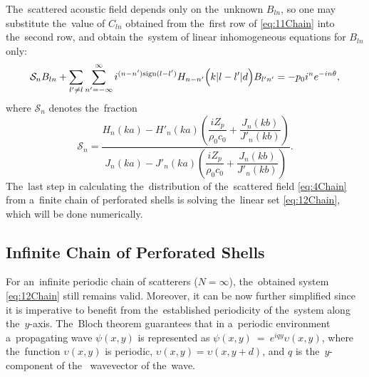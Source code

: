 The~scattered acoustic field depends only on the~unknown $B_{ln}$, so one may substitute the~value of $C_{ln}$ obtained from the~first row of \cref{eq:11Chain} into the~second row, and obtain the~system of linear inhomogeneous equations for $B_{ln}$ only:
\begin{equation}
\label{eq:12Chain}
\mathcal{S}_n B_{ln} + \sum\limits_{l' \neq l} \sum\limits_{n'=-\infty}^{\infty} i^{(n-n')\text{sign}(l-l')} H_{n-n'}\Big(k|l-l'|d\Big) B_{l'n'} = -p_0 i^n e^{-i n\theta},
\end{equation}
where $\mathcal{S}_n$ denotes the~fraction
\begin{equation}
\label{eq:13Chain}
\mathcal{S}_n = \dfrac{H_n\left(k a\right)-H'_n\left(k a\right)\left(\dfrac{i Z_p}{\rho_0 c_0}+\dfrac{J_{n}\left(k b\right)}{J'_{n}\left(k b\right)}\right)}{J_n\left(k a\right)-J'_n\left(k a\right)\left(\dfrac{i Z_p}{\rho_0 c_0}+\dfrac{J_{n}\left(k b\right)}{J'_{n}\left(k b\right)}\right)}.
\end{equation}
The~last step in calculating the~distribution of the~scattered field \cref{eq:4Chain} from a~finite chain of perforated shells is solving the~linear set \cref{eq:12Chain}, which will be done numerically.


\subsection{Infinite Chain of Perforated Shells}

For an~infinite periodic chain of scatterers ($N=\infty$), the~obtained system \cref{eq:12Chain} still remains valid.
Moreover, it can be now further simplified since it is imperative to benefit from the~established periodicity of the~system along the~$y$-axis.
The~Bloch theorem guarantees that in a~periodic environment a~propagating wave $\psi(x,y)$ is represented as $\psi(x,y)~=~e^{iqy}\upsilon(x,y)$, where the~function $\upsilon(x,y)$ is periodic, $\upsilon(x,y)=\upsilon(x,y+d)$, and $q$ is the~$y$-component of the~ wavevector of the~wave.

